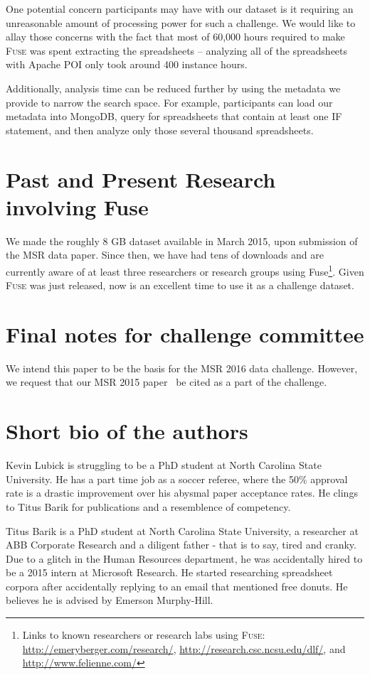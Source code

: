 \documentclass[conference]{IEEEtran}
\begin{document}
One potential concern participants may have with our dataset is it requiring an unreasonable amount of processing power for such a challenge.
We would like to allay those concerns with the fact that most of 60,000 hours required to make \textsc{Fuse} was spent extracting the spreadsheets -- 
analyzing all of the spreadsheets with Apache POI only took around 400 instance hours.

Additionally, analysis time can be reduced further by using the metadata we provide to narrow the search space.
For example, participants can load our metadata into MongoDB, query for spreadsheets that contain at least one IF statement, and then analyze only those several thousand spreadsheets.

\section{Past and Present Research involving Fuse}
We made the roughly 8 GB dataset available in March 2015, upon submission of the MSR data paper.  
Since then, we have had tens of downloads and are currently aware of at least three researchers or research groups using Fuse\footnote{Links to known researchers or research labs using \textsc{Fuse}: \url{http://emeryberger.com/research/}, \url{http://research.csc.ncsu.edu/dlf/}, and \url{http://www.felienne.com/}}.
Given \textsc{Fuse} was just released, now is an excellent time to use it as a challenge dataset.



\section{Final notes for challenge committee}
We intend this paper to be the basis for the MSR 2016 data challenge.  
However, we request that our MSR 2015 paper~\cite{barik2015} be cited as a part of the challenge.


\section{Short bio of the authors}

Kevin Lubick is struggling to be a PhD student at North Carolina State University.  He has a part time job as a soccer referee, where the 50\% approval rate is a drastic improvement over his abysmal paper acceptance rates.  He clings to Titus Barik for publications and a resemblence of competency.

Titus Barik is a PhD student at North Carolina State University, a researcher at ABB Corporate Research and a diligent father - that is to say, tired and cranky.  Due to a glitch in the Human Resources department, he was accidentally hired to be a 2015 intern at Microsoft Research.  He started researching spreadsheet corpora after accidentally replying to an email that mentioned free donuts.  He believes he is advised by Emerson Murphy-Hill.
\end{document}
